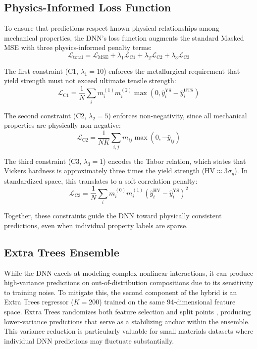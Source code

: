 \documentclass[conference]{IEEEtran}
\begin{document}
\subsection{Physics-Informed Loss Function}
To ensure that predictions respect known physical relationships among mechanical properties, the DNN's loss function augments the standard Masked MSE with three physics-informed penalty terms:
\begin{equation}
\mathcal{L}_{\text{total}} = \mathcal{L}_{\text{MSE}} + \lambda_1 \mathcal{L}_{\text{C1}} + \lambda_2 \mathcal{L}_{\text{C2}} + \lambda_3 \mathcal{L}_{\text{C3}}
\end{equation}

The first constraint (C1, $\lambda_1=10$) enforces the metallurgical requirement that yield strength must not exceed ultimate tensile strength:
\begin{equation}
\mathcal{L}_{\text{C1}} = \frac{1}{N}\sum_i m_i^{(1)} m_i^{(2)} \max(0, \hat{y}_i^{\text{YS}} - \hat{y}_i^{\text{UTS}})
\end{equation}

The second constraint (C2, $\lambda_2=5$) enforces non-negativity, since all mechanical properties are physically non-negative:
\begin{equation}
\mathcal{L}_{\text{C2}} = \frac{1}{NK}\sum_{i,j} m_{ij} \max(0, -\hat{y}_{ij})
\end{equation}

The third constraint (C3, $\lambda_3=1$) encodes the Tabor relation, which states that Vickers hardness is approximately three times the yield strength ($\text{HV} \approx 3\sigma_y$). In standardized space, this translates to a soft correlation penalty:
\begin{equation}
\mathcal{L}_{\text{C3}} = \frac{1}{N}\sum_i m_i^{(0)} m_i^{(1)} (\hat{y}_i^{\text{HV}} - \hat{y}_i^{\text{YS}})^2
\end{equation}

Together, these constraints guide the DNN toward physically consistent predictions, even when individual property labels are sparse.

\subsection{Extra Trees Ensemble}
While the DNN excels at modeling complex nonlinear interactions, it can produce high-variance predictions on out-of-distribution compositions due to its sensitivity to training noise. To mitigate this, the second component of the hybrid is an Extra Trees regressor ($K=200$) trained on the same 94-dimensional feature space. Extra Trees randomizes both feature selection and split points \cite{b14}, producing lower-variance predictions that serve as a stabilizing anchor within the ensemble. This variance reduction is particularly valuable for small materials datasets where individual DNN predictions may fluctuate substantially.
\end{document}
